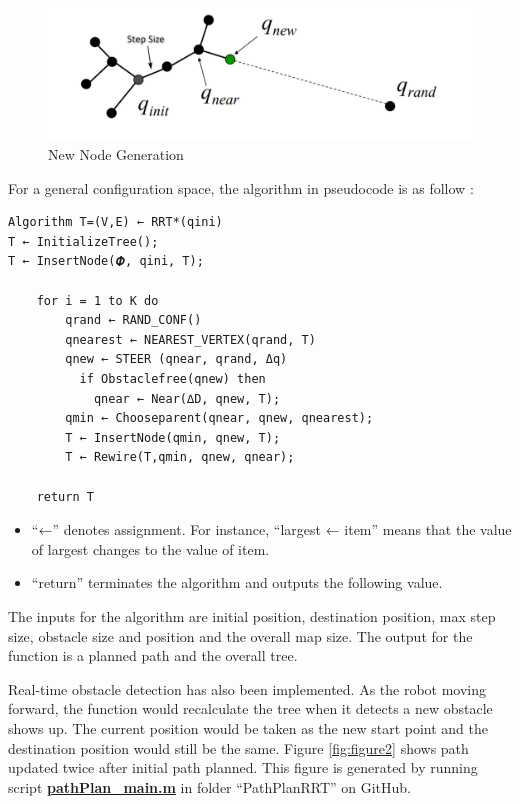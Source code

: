 \documentclass[
  oneside]{ubcthesis}
\providecommand{\tightlist}{%
  \setlength{\itemsep}{0pt}\setlength{\parskip}{0pt}}
\begin{document}
\begin{figure}

{\centering \includegraphics[width=0.6\linewidth]{figures/1} 

}

\caption{New Node Generation\citep{choset2015robotic}}\label{fig:figure1}
\end{figure}



For a general configuration space, the algorithm in pseudocode is as follow \citep{rrtCompare}:

\begin{verbatim}
Algorithm T=(V,E) ← RRT*(qini)
T ← InitializeTree();
T ← InsertNode(𝜱, qini, T);

    for i = 1 to K do
        qrand ← RAND_CONF()
        qnearest ← NEAREST_VERTEX(qrand, T)
        qnew ← STEER (qnear, qrand, Δq)
          if Obstaclefree(qnew) then
            qnear ← Near(∆D, qnew, T);
        qmin ← Chooseparent(qnear, qnew, qnearest);
        T ← InsertNode(qmin, qnew, T);
        T ← Rewire(T,qmin, qnew, qnear);
      
    return T
\end{verbatim}

\begin{itemize}
\tightlist
\item
  ``←'' denotes assignment. For instance, ``largest ← item'' means that the value of largest changes to the value of item.
\item
  ``return'' terminates the algorithm and outputs the following value.
\end{itemize}

The inputs for the algorithm are initial position, destination position, max step size, obstacle size and position and the overall map size. The output for the function is a planned path and the overall tree.

Real-time obstacle detection has also been implemented. As the robot moving forward, the function would recalculate the tree when it detects a new obstacle shows up. The current position would be taken as the new start point and the destination position would still be the same. Figure \ref{fig:figure2} shows path updated twice after initial path planned. This figure is generated by running script \textbf{\href{https://github.com/luckymeng7/EECE597/blob/master/PathPlanRRT/pathPlan_main.m}{pathPlan\_main.m}} in folder ``PathPlanRRT'' on GitHub.
\end{document}
